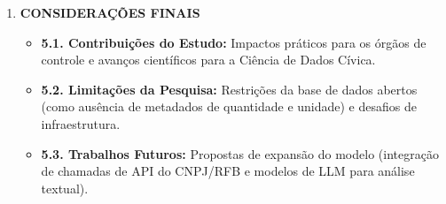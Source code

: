 \documentclass[
    12pt,               %
    openright,          %
    oneside,            %
    a4paper,            %
    chapter=TITLE,      %
    sumario=tradicional,%
    english,            %
    brazilian,          %
 ]{abntex2}
\begin{document}
\begin{enumerate}
\begin{itemize}
        \item \textbf{4.2. Triagem Estatística e Testes de Aderência:} Resultados da aderência à Lei de Benford, testes $\chi^2$ e identificação de desvios de $Z$-Score.
        \item \textbf{4.3. Detecção por Aprendizado Não Supervisionado:} Mapeamento de anomalias globais (ISO) e locais de densidade (LOF).
        \item \textbf{4.4. Análise Textual e Contextual:} Resultados de TF-IDF/DBSCAN e interpretação das sinalizações.
        \item \textbf{4.5. Estrutura de Redes e Concentração de Fornecedores:} Projeção de grafos e descrição das relações entre órgãos e credores.
        \item \textbf{4.6. Escore de Prioridade e Candidatos a Anomalia:} Análise das sinalizações combinadas e dos resultados da interpretação contextual.
    \end{itemize}
    \item \textbf{CONSIDERAÇÕES FINAIS}
    \begin{itemize}
        \item \textbf{5.1. Contribuições do Estudo:} Impactos práticos para os órgãos de controle e avanços científicos para a Ciência de Dados Cívica.
        \item \textbf{5.2. Limitações da Pesquisa:} Restrições da base de dados abertos (como ausência de metadados de quantidade e unidade) e desafios de infraestrutura.
        \item \textbf{5.3. Trabalhos Futuros:} Propostas de expansão do modelo (integração de chamadas de API do CNPJ/RFB e modelos de LLM para análise textual).
    \end{itemize}
\end{enumerate}

\postextual


\end{document}
